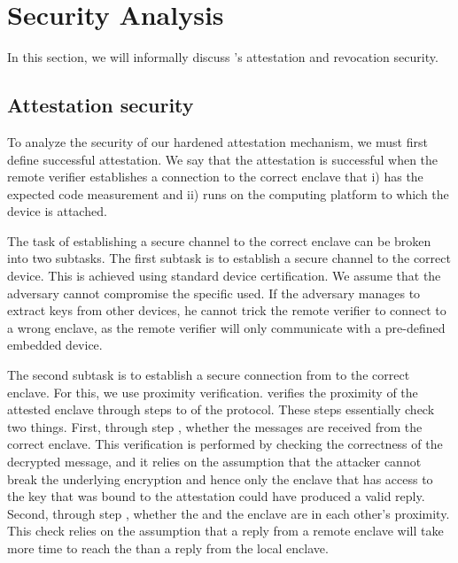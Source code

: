 \section{Security Analysis}


In this section, we will informally discuss \name{}'s attestation and revocation security. 
\subsection{Attestation security}

To analyze the security of our hardened attestation mechanism, we must first define successful attestation. We say that the attestation is successful when the remote verifier establishes a connection to the correct enclave that i) has the expected code measurement and ii) runs on the computing platform to which the \device device is attached.


The task of establishing a secure channel to the correct enclave can be broken into two subtasks. The first subtask is to establish a secure channel to the correct \device device. This is achieved using standard device certification. We assume that the adversary cannot compromise the specific \device used. If the adversary manages to extract keys from other \device devices, he cannot trick the remote verifier to connect to a wrong enclave, as the remote verifier will only communicate with a pre-defined embedded device.




The second subtask is to establish a secure connection from \device to the correct enclave. For this, we use proximity verification. \device verifies the proximity of the attested enclave through steps \five to \eight of the protocol. These steps essentially check two things. First, through step \seven, whether the messages are received from the correct enclave. This verification is performed by checking the correctness of the decrypted message, and it relies on the assumption that the attacker cannot break the underlying encryption and hence only the enclave that has access to the key that was bound to the attestation could have produced a valid reply. Second, through step \eight, whether the \device and the enclave are in each other's proximity. This check relies on the assumption that a reply from a remote enclave will take more time to reach the \device than a reply from the local enclave.

